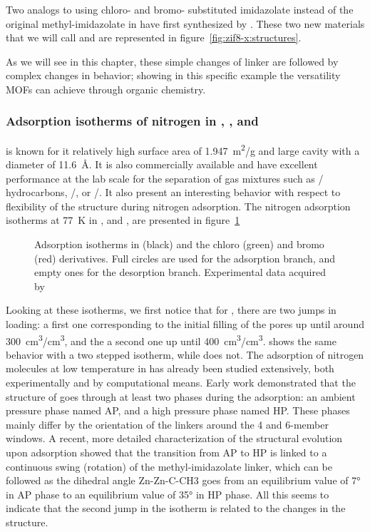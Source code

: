 \documentclass[thesis]{subfiles}
\begin{document}
Two analogs to  using chloro- and bromo- substituted imidazolate instead of
the original methyl-imidazolate in  have first synthesized by
\citeauthor{Li2009}\cite{Li2009}. These two new materials that we will call
\ZIFCl and \ZIFBr are represented in figure~\ref{fig:zif8-x:structures}.

As we will see in this chapter, these simple changes of linker are followed by
complex changes in behavior; showing in this specific example the versatility
MOFs can achieve through organic chemistry.

\FloatBarrier
\subsubsection{Adsorption isotherms of nitrogen in , \ZIFCl, and \ZIFBr}

 is known for it relatively high surface area of \SI{1.947}{m^2/g} and
large cavity with a diameter of \SI{11.6}{\AA}\cite{Park2006}. It is also
commercially available and have excellent performance at the lab scale for the
separation of gas mixtures such as / hydrocarbons,
/, or /\cite{Li2009,Bux2011}. It also present an
interesting behavior with respect to flexibility of the structure during
nitrogen adsorption. The nitrogen adsorption isotherms at \SI{77}{K} in ,
\ZIFCl and \ZIFBr, are presented in figure~\ref{fig:zif8x:isotherms}

\begin{figure}[ht]
    \centering
    
    \caption{Adsorption isotherms in  (black) and the chloro (green) and
    bromo (red) derivatives. Full circles are used for the adsorption branch,
    and empty ones for the desorption branch. Experimental data acquired by
    \citeauthor{Chaplais2018}\cite{Chaplais2018}}
    \label{fig:zif8x:isotherms}
\end{figure}

Looking at these isotherms, we first notice that for , there are two jumps
in loading: a first one corresponding to the initial filling of the pores up
until around \SI{300}{cm^3/cm^3}, and the a second one up until
\SI{400}{cm^3/cm^3}. \ZIFCl shows the same behavior with a two stepped isotherm,
while \ZIFBr does not. The adsorption of nitrogen molecules at low temperature
in  has already been studied extensively, both experimentally and by
computational means. Early work demonstrated that the structure of  goes
through at least two phases during the adsorption: an ambient pressure phase
named AP, and a high pressure phase named HP. These phases mainly differ by the
orientation of the linkers around the 4 and 6-member
windows.\cite{FairenJimenez2011} A recent, more detailed characterization of the
structural evolution upon adsorption showed that the transition from AP to HP is
linked to a continuous swing (rotation) of the methyl-imidazolate linker, which
can be followed as the dihedral angle Zn-Zn-C-CH3 goes from an equilibrium value
of 7° in AP phase to an equilibrium value of 35° in HP phase.\cite{Coudert2017}
All this seems to indicate that the second jump in the isotherm is related to
the changes in the structure.
\end{document}

